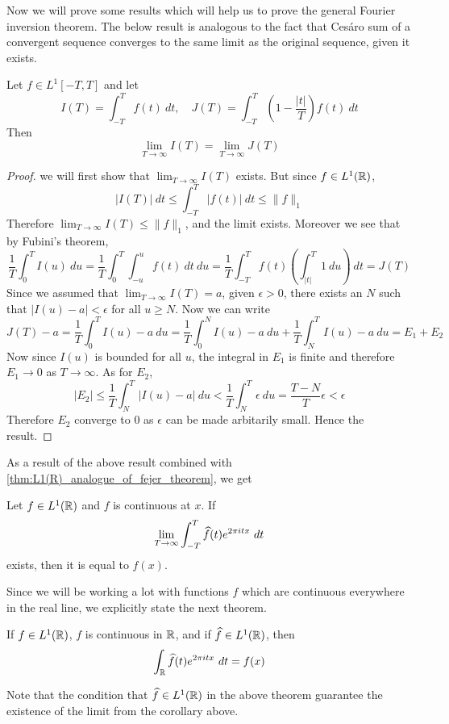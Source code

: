 Now we will prove some results which will help us to prove the general Fourier inversion theorem. The below result is analogous to the fact that Ces\'aro sum of a convergent sequence converges to the same limit as the original sequence, given it exists.
\begin{proposition}
  \label{prop:cesaro_integral_converge_to_same_limit}
  Let $f \in L^1[-T, T]$ and let $$I(T) = \int_{-T}^T f(t) \ dt, \quad J(T) = \int_{-T}^T\left(1-\frac{|t|}{T}\right)f(t)\ dt$$
  Then $$\lim_{T\to \infty} I(T) = \lim_{T\to \infty}J(T)$$
\end{proposition}
\begin{proof}
  we will first show that $\lim_{T\to \infty}I(T)$ exists. But since $f\in L^1(\mathbb R)$, $$|I(T)| \ dt \le \int_{-T}^T |f(t)| \ dt \le \|f\|_1$$
  Therefore $\lim_{T \to \infty}I(T) \le \|f\|_1$, and the limit exists. Moreover we see that by Fubini's theorem, $$\frac{1}{T} \int_0^T I(u) \ du = \frac{1}{T} \int_0^T\int_{-u}^u f(t) \ dt \ du = \frac{1}{T}\int_{-T}^T f(t) \left(\int_{|t|}^T 1 \ du \right) \ dt = J(T)$$
  Since we assumed that $\lim_{T\to \infty} I(T) = a$, given $\epsilon > 0$, there exists an $N$ such that $|I(u) - a| < \epsilon$ for all $u \ge N$. Now we can write $$J(T) - a = \frac{1}{T}\int_0^T I(u) - a \ du = \frac{1}{T}\int_0^N I(u) - a \ du + \frac{1}{T}\int_N^T I(u) - a \ du = E_1 + E_2$$
  Now since $I(u)$ is bounded for all $u$, the integral in $E_1$ is finite and therefore $E_1 \to 0$ as $T\to \infty$. As for $E_2$, $$|E_2| \le \frac{1}{T} \int_N^T |I(u) -a| \ du < \frac{1}{T}\int_N^T \epsilon \ du = \frac{T-N}{T}\epsilon < \epsilon$$
  Therefore $E_2$ converge to 0 as $\epsilon$ can be made arbitarily small. Hence the result. %
\end{proof}

As a result of the above result combined with \autoref{thm:L1(R)_analogue_of_fejer_theorem}, we get
\begin{corollary}
  \label{cor:fourier_inversion_equals_f_at_points_of_continuity}
  Let $f\in L^1(\mathbb R)$ and $f$ is continuous at $x$. If $$\lim_{T\to \infty} \int_{-T}^T\widehat{f}(t)e^{2\pi itx} \ dt$$
  exists, then it is equal to $f(x)$.
\end{corollary}

Since we will be working a lot with functions $f$ which are continuous everywhere in the real line, we explicitly state the next theorem.
\begin{theorem}
  If $f\in L^1(\mathbb R)$, $f$ is continuous in $\mathbb R$, and if $\widehat{f} \in L^1(\mathbb R)$, then $$\int_\mathbb R \widehat{f}(t)e^{2\pi itx} \ dt = f(x)$$
\end{theorem}
Note that the condition that $\widehat{f} \in L^1(\mathbb R)$ in the above theorem guarantee the existence of the limit from the corollary above.

